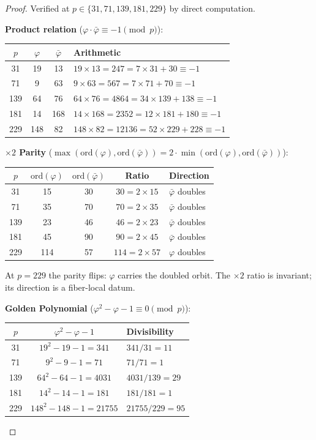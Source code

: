 \documentclass[12pt,oneside]{article}
\theoremstyle{principia}
\theoremstyle{definition}
\theoremstyle{remark}
\providecommand{\vp}{\varphi}
\providecommand{\vpbar}{\bar{\varphi}}
\begin{document}
\begin{proof}
Verified at $p \in \{31, 71, 139, 181, 229\}$ by direct computation.

\medskip\noindent\textbf{Product relation} ($\vp \cdot \vpbar \equiv -1 \pmod{p}$):
\begin{center}\small
\begin{tabular}{@{}cccl@{}}
\toprule
$p$ & $\vp$ & $\vpbar$ & Arithmetic \\
\midrule
31 & 19 & 13 & $19 \times 13 = 247 = 7 \times 31 + 30 \equiv -1$ \\
71 & 9 & 63 & $9 \times 63 = 567 = 7 \times 71 + 70 \equiv -1$ \\
139 & 64 & 76 & $64 \times 76 = 4864 = 34 \times 139 + 138 \equiv -1$ \\
181 & 14 & 168 & $14 \times 168 = 2352 = 12 \times 181 + 180 \equiv -1$ \\
229 & 148 & 82 & $148 \times 82 = 12136 = 52 \times 229 + 228 \equiv -1$ \\
\bottomrule
\end{tabular}
\end{center}

\medskip\noindent\textbf{$\times 2$ Parity} ($\max(\mathrm{ord}(\vp), \mathrm{ord}(\vpbar)) = 2 \cdot \min(\mathrm{ord}(\vp), \mathrm{ord}(\vpbar))$):
\begin{center}\small
\begin{tabular}{@{}ccccl@{}}
\toprule
$p$ & $\mathrm{ord}(\vp)$ & $\mathrm{ord}(\vpbar)$ & Ratio & Direction \\
\midrule
31 & 15 & 30 & $30 = 2 \times 15$ & $\vpbar$ doubles \\
71 & 35 & 70 & $70 = 2 \times 35$ & $\vpbar$ doubles \\
139 & 23 & 46 & $46 = 2 \times 23$ & $\vpbar$ doubles \\
181 & 45 & 90 & $90 = 2 \times 45$ & $\vpbar$ doubles \\
229 & 114 & 57 & $114 = 2 \times 57$ & $\vp$ doubles \\
\bottomrule
\end{tabular}
\end{center}
At $p = 229$ the parity flips: $\vp$ carries the doubled orbit. The $\times 2$ ratio is invariant; its direction is a fiber-local datum.

\medskip\noindent\textbf{Golden Polynomial} ($\vp^2 - \vp - 1 \equiv 0 \pmod{p}$):
\begin{center}\small
\begin{tabular}{@{}ccl@{}}
\toprule
$p$ & $\vp^2 - \vp - 1$ & Divisibility \\
\midrule
31 & $19^2 - 19 - 1 = 341$ & $341 / 31 = 11$ \\
71 & $9^2 - 9 - 1 = 71$ & $71 / 71 = 1$ \\
139 & $64^2 - 64 - 1 = 4031$ & $4031 / 139 = 29$ \\
181 & $14^2 - 14 - 1 = 181$ & $181 / 181 = 1$ \\
229 & $148^2 - 148 - 1 = 21755$ & $21755 / 229 = 95$ \\
\bottomrule
\end{tabular}
\end{center}
\qedhere
\end{proof}
\end{document}
